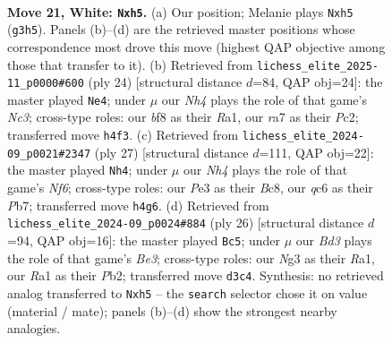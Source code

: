 \documentclass[11pt]{article}
\begin{document}
\begin{figure}[p]\centering
\begin{subfigure}{0.46\textwidth}\centering
\resizebox{\linewidth}{!}{%
\newchessgame
\chessboard[
  setfen={1nr2bk1/rp1b1p2/p1q1pn2/B5pp/7N/3BP1N1/PP3PPP/R2QR1K1 w - - 0 21},
  showmover=false,
  pgfstyle=straightmove, color=movearrow, markmove={g3-h5}
]}
\caption{}
\end{subfigure}\hfill
\begin{subfigure}{0.46\textwidth}\centering
\resizebox{\linewidth}{!}{%
\newchessgame
\chessboard[
  setfen={r1bq1rk1/pp2bppp/2n2n2/8/3p4/PNNB4/1PPB1PPP/R2QR1K1 w - - 0 13},
  showmover=false,
  pgfstyle=straightmove, color=movearrow, markmove={c3-e4}
]}
\caption{}
\end{subfigure}
\\[4pt]
\begin{subfigure}{0.46\textwidth}\centering
\resizebox{\linewidth}{!}{%
\newchessgame
\chessboard[
  setfen={r1bq1rk1/ppp3bp/2np2p1/8/2P1P3/2NP1nBP/PP2NPB1/R2Q1R1K b - - 4 14},
  showmover=false,
  pgfstyle=straightmove, color=movearrow, markmove={f3-h4}
]}
\caption{}
\end{subfigure}\hfill
\begin{subfigure}{0.46\textwidth}\centering
\resizebox{\linewidth}{!}{%
\newchessgame
\chessboard[
  setfen={r1b2rk1/p4pbp/5np1/3pp2q/8/P3BNP1/1P2PPBP/R2Q1RK1 w - - 0 14},
  showmover=false,
  pgfstyle=straightmove, color=movearrow, markmove={e3-c5}
]}
\caption{}
\end{subfigure}
\caption{\textbf{Move 21, White: \texttt{Nxh5}.} (a) Our position; Melanie plays \texttt{Nxh5} (\texttt{g3h5}). Panels (b)--(d) are the retrieved master positions whose correspondence most drove this move (highest QAP objective among those that transfer to it). (b) Retrieved from \texttt{lichess\_elite\_2025-11\_p0000\#600} (ply 24) [structural distance $d$=84, QAP obj=24]: the master played \texttt{Ne4}; under $\mu$ our \emph{Nh4} plays the role of that game's \emph{Nc3}; cross-type roles: our \emph{b}f8 as their \emph{R}a1, our \emph{r}a7 as their \emph{P}c2; transferred move \texttt{h4f3}. (c) Retrieved from \texttt{lichess\_elite\_2024-09\_p0021\#2347} (ply 27) [structural distance $d$=111, QAP obj=22]: the master played \texttt{Nh4}; under $\mu$ our \emph{Nh4} plays the role of that game's \emph{Nf6}; cross-type roles: our \emph{P}e3 as their \emph{B}c8, our \emph{q}c6 as their \emph{P}b7; transferred move \texttt{h4g6}. (d) Retrieved from \texttt{lichess\_elite\_2024-09\_p0024\#884} (ply 26) [structural distance $d$=94, QAP obj=16]: the master played \texttt{Bc5}; under $\mu$ our \emph{Bd3} plays the role of that game's \emph{Be3}; cross-type roles: our \emph{N}g3 as their \emph{R}a1, our \emph{R}a1 as their \emph{P}b2; transferred move \texttt{d3c4}. Synthesis: no retrieved analog transferred to \texttt{Nxh5} -- the \texttt{search} selector chose it on value (material / mate); panels (b)--(d) show the strongest nearby analogies.}
\label{fig:thought-m40}
\end{figure}
\end{document}

